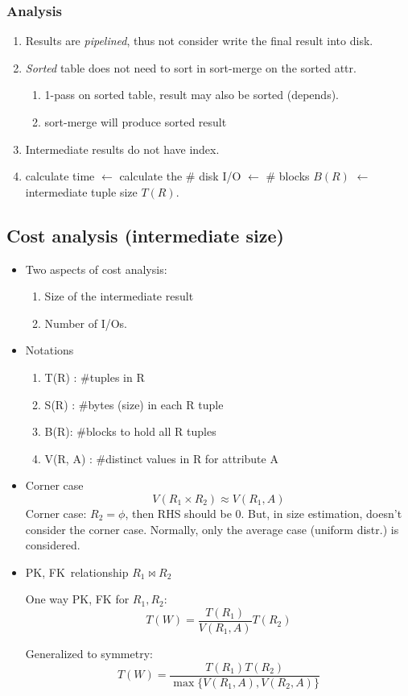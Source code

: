 \documentclass[a4paper]{report}
\begin{document}
\subsubsection{Analysis}
\begin{enumerate}
\item Results are \textit{pipelined}, thus not consider write the final result into disk. 
\item \textit{Sorted} table does not need to sort in sort-merge on the sorted attr.
\begin{enumerate}
\item 1-pass on sorted table, result may also be sorted (depends).
\item sort-merge will produce sorted result
\end{enumerate}
\item Intermediate results do not have index. 
\item calculate time $\leftarrow$ calculate the \# disk I/O $\leftarrow$ \# blocks $B(R)$ $\leftarrow$ intermediate tuple size $T(R)$. 
\end{enumerate}
\subsection{Cost analysis (intermediate size)}
\begin{itemize}
\item Two aspects of cost analysis:
\begin{enumerate}
\item Size of the intermediate result 
\item Number of I/Os.
\end{enumerate}
\item Notations
\begin{enumerate}
\item T(R) : #tuples in R
\item S(R) : #bytes (size) in each R tuple
\item B(R): #blocks to hold all R tuples 
\item V(R, A) : #distinct values in R for attribute A
\end{enumerate}
\item Corner case 
$$
V(R_1\times R_2) \approx V(R_1, A)
$$
Corner case: $R_2=\phi$, then RHS should be 0. But, in size estimation, doesn't consider the corner case. Normally, only the average case (uniform distr.) is considered. 
\end{itemize}
\begin{itemize}
\item \textbraceleft PK, FK\textbraceright\ relationship $R_1\bowtie R_2$

One way PK, FK for $R_1, R_2$: 
$$
T(W) = \frac{T(R_1)}{V(R_1, A)} T(R_2)
$$

Generalized to symmetry: 
$$
T(W) = \frac{T(R_1)T(R_2)}{\max\{V(R_1, A), V(R_2, A)\}}
$$
\end{itemize}
\end{document}
